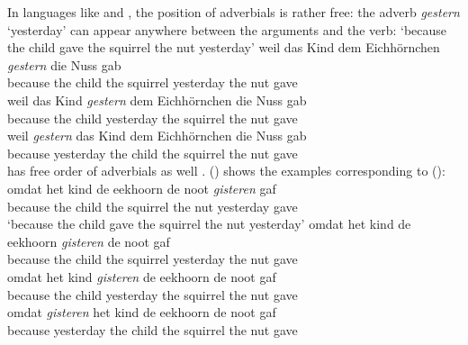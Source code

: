 In languages like  and , the position of adverbials is rather free: the adverb \emph{gestern}
`yesterday' can appear anywhere between the arguments and the verb:
\eal
\ex
{}
\glt `because the child gave the squirrel the nut yesterday'
\ex 
\gll weil das Kind dem Eichhörnchen \emph{gestern} die Nuss gab\\
     because the child the squirrel yesterday the nut gave\\
\ex 
\gll weil das Kind \emph{gestern} dem Eichhörnchen die Nuss gab\\
     because the child yesterday the squirrel the nut gave\\
\ex 
\gll weil \emph{gestern} das Kind dem Eichhörnchen die Nuss gab\\
     because yesterday the child the squirrel the nut gave\\
\zl
{} has free order of adverbials as well \parencites[]{Neeleman94b-u}[]{Koster99a-u}[Section~6]{Bouma2003a-u}. () shows the  examples corresponding to
():
\eal
\ex
\gll omdat het kind de eekhoorn de noot \emph{gisteren} gaf\\ 
     because the child the squirrel the nut yesterday gave\\\dutch
\glt `because the child gave the squirrel the nut yesterday'
\ex 
\gll omdat het kind de eekhoorn \emph{gisteren} de noot gaf\\
     because the child the squirrel yesterday the nut gave\\
\ex 
\gll omdat het kind \emph{gisteren} de eekhoorn de noot gaf\\
     because the child yesterday the squirrel the nut gave\\
\ex 
\gll omdat \emph{gisteren} het kind de eekhoorn de noot gaf\\
     because yesterday the child the squirrel the nut gave\\
\zl


